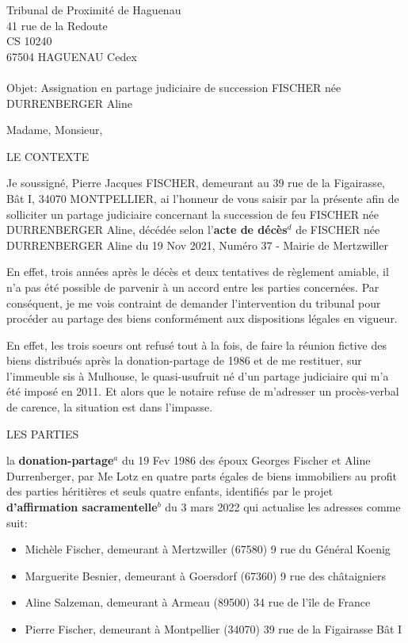 \documentclass[
]{letter}
\author{Pierre J. FISCHER}
\date{24 juillet 2026}
\begin{document}
\signature{Pierre J. FISCHER}
\address{Pierre J. FISCHER\\fishrp@pm.me +33 76748 2009\\39 rue de la
Figairasse, Bat I\\MONTPELLIER 34070\\F-}
\begin{letter}{Tribunal de Proximité de Haguenau\\41 rue de la
Redoute\\CS 10240\\67504 HAGUENAU Cedex\\ ~ \\Objet: Assignation en
partage judiciaire de succession FISCHER née DURRENBERGER Aline}
\opening{Madame, Monsieur,}


LE CONTEXTE

Je soussigné, Pierre Jacques FISCHER, demeurant au 39 rue de la
Figairasse, Bât I, 34070 MONTPELLIER, ai l'honneur de vous saisir par la
présente afin de solliciter un partage judiciaire concernant la
succession de feu FISCHER née DURRENBERGER Aline, décédée selon
l'\textbf{acte de décès}\(^d\) de FISCHER née DURRENBERGER Aline du 19
Nov 2021, Numéro 37 - Mairie de Mertzwiller

En effet, trois années après le décès et deux tentatives de règlement
amiable, il n'a pas été possible de parvenir à un accord entre les
parties concernées. Par conséquent, je me vois contraint de demander
l'intervention du tribunal pour procéder au partage des biens
conformément aux dispositions légales en vigueur.

En effet, les trois soeurs ont refusé tout à la fois, de faire la
réunion fictive des biens distribués après la donation-partage de 1986
et de me restituer, sur l'immeuble sis à Mulhouse, le quasi-usufruit né
d'un partage judiciaire qui m'a été imposé en 2011. Et alors que le
notaire refuse de m'adresser un procès-verbal de carence, la situation
est dans l'impasse.

LES PARTIES

la \textbf{donation-partage}\(^a\) du 19 Fev 1986 des époux Georges
Fischer et Aline Durrenberger, par Me Lotz en quatre parts égales de
biens immobiliers au profit des parties héritières et seuls quatre
enfants, identifiés par le projet \textbf{d'affirmation
sacramentelle}\(^b\) du 3 mars 2022 qui actualise les adresses comme
suit:

\begin{itemize}
\item
  Michèle Fischer, demeurant à Mertzwiller (67580) 9 rue du Général
  Koenig
\item
  Marguerite Besnier, demeurant à Goersdorf (67360) 9 rue des
  châtaigniers
\item
  Aline Salzeman, demeurant à Armeau (89500) 34 rue de l'île de France
\item
  Pierre Fischer, demeurant à Montpellier (34070) 39 rue de la
  Figairasse Bât I


\end{itemize}
\end{letter}
\end{document}
